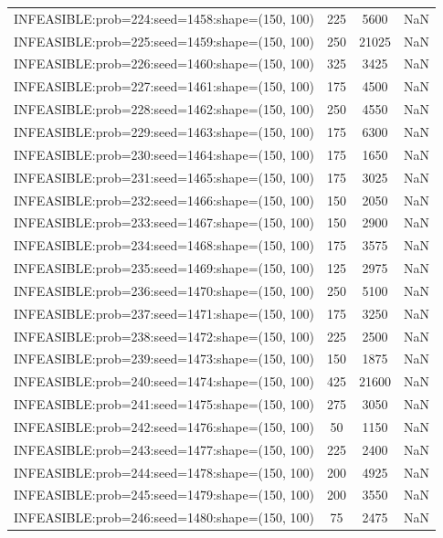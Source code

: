 \begin{longtable}{lccc}
INFEASIBLE:prob=224:seed=1458:shape=(150, 100) &      225 &  5600 &    NaN \\
INFEASIBLE:prob=225:seed=1459:shape=(150, 100) &      250 & 21025 &    NaN \\
INFEASIBLE:prob=226:seed=1460:shape=(150, 100) &      325 &  3425 &    NaN \\
INFEASIBLE:prob=227:seed=1461:shape=(150, 100) &      175 &  4500 &    NaN \\
INFEASIBLE:prob=228:seed=1462:shape=(150, 100) &      250 &  4550 &    NaN \\
INFEASIBLE:prob=229:seed=1463:shape=(150, 100) &      175 &  6300 &    NaN \\
INFEASIBLE:prob=230:seed=1464:shape=(150, 100) &      175 &  1650 &    NaN \\
INFEASIBLE:prob=231:seed=1465:shape=(150, 100) &      175 &  3025 &    NaN \\
INFEASIBLE:prob=232:seed=1466:shape=(150, 100) &      150 &  2050 &    NaN \\
INFEASIBLE:prob=233:seed=1467:shape=(150, 100) &      150 &  2900 &    NaN \\
INFEASIBLE:prob=234:seed=1468:shape=(150, 100) &      175 &  3575 &    NaN \\
INFEASIBLE:prob=235:seed=1469:shape=(150, 100) &      125 &  2975 &    NaN \\
INFEASIBLE:prob=236:seed=1470:shape=(150, 100) &      250 &  5100 &    NaN \\
INFEASIBLE:prob=237:seed=1471:shape=(150, 100) &      175 &  3250 &    NaN \\
INFEASIBLE:prob=238:seed=1472:shape=(150, 100) &      225 &  2500 &    NaN \\
INFEASIBLE:prob=239:seed=1473:shape=(150, 100) &      150 &  1875 &    NaN \\
INFEASIBLE:prob=240:seed=1474:shape=(150, 100) &      425 & 21600 &    NaN \\
INFEASIBLE:prob=241:seed=1475:shape=(150, 100) &      275 &  3050 &    NaN \\
INFEASIBLE:prob=242:seed=1476:shape=(150, 100) &       50 &  1150 &    NaN \\
INFEASIBLE:prob=243:seed=1477:shape=(150, 100) &      225 &  2400 &    NaN \\
INFEASIBLE:prob=244:seed=1478:shape=(150, 100) &      200 &  4925 &    NaN \\
INFEASIBLE:prob=245:seed=1479:shape=(150, 100) &      200 &  3550 &    NaN \\
INFEASIBLE:prob=246:seed=1480:shape=(150, 100) &       75 &  2475 &    NaN \\

\end{longtable}
